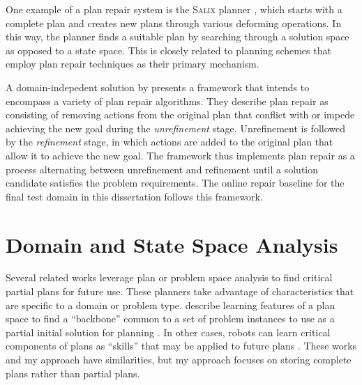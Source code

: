 One example of a plan repair system is the \textsc{Salix} planner \citep{logan97routeplanning}, which starts with a complete plan and creates new plans through various deforming operations.  In this way, the planner finds a suitable plan by searching through a solution space as opposed to a state space.  This is closely related to planning schemes that employ plan repair techniques as their primary mechanism.




A domain-indepedent solution by \cite{krogt05planrepair} presents a framework that intends to encompass a variety of plan repair algorithms.  They describe plan repair as consisting of removing actions from the original plan that conflict with or impede achieving the new goal during the \textit{unrefinement} stage.  Unrefinement is followed by the \textit{refinement} stage, in which actions are added to the original plan that allow it to achieve the new goal. The framework thus implements plan repair as a process alternating between  unrefinement and refinement until a  solution candidate satisfies the problem requirements.  The online repair baseline for the final test domain in this dissertation follows this framework.



\section{Domain and State Space Analysis}
\label{sec:state-space-analysis}

Several related works leverage plan or problem space analysis to find critical partial plans for future use. These planners take advantage of characteristics that are specific to a domain or problem type.  \citeauthor{bulka08useful}  describe learning features of a plan space to find a ``backbone'' common to a set of problem instances to use as a partial initial solution for planning \citep{bulka06analyzing,bulka08useful}.  In other cases, robots can learn critical components of plans as ``skills'' that may be applied to future plans \citep{konidaris08autonomous,konidaris08sensorimotor}.  These works and my approach have similarities, but my approach focuses on storing complete plans rather than partial plans.

